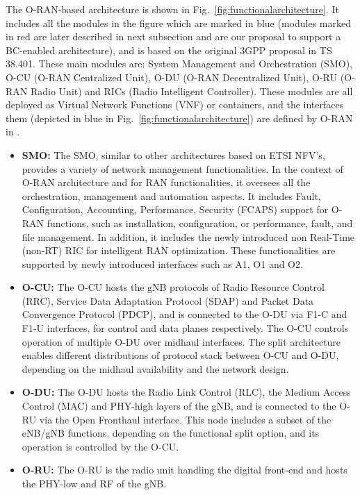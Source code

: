 \documentclass[journal]{IEEEtran}
\begin{document}
The O-RAN-based architecture is shown in Fig.~\ref{fig:functionalarchitecture}. It includes all the modules in the figure which are marked in blue (modules marked in red are later described in next subsection and are our proposal to support a BC-enabled architecture), and is based on the original 3GPP proposal in TS 38.401. These main modules are: System Management and Orchestration (SMO), O-CU (O-RAN Centralized Unit), O-DU (O-RAN Decentralized Unit), O-RU (O-RAN Radio Unit) and RICs (Radio Intelligent Controller). These modules are all deployed as Virtual Network Functions (VNF) or containers, and the interfaces them (depicted in blue in Fig.~\ref{fig:functionalarchitecture}) are defined by O-RAN in \cite{ORAN2}.  
\begin{itemize}
    \item \textbf{SMO:} The SMO, similar to other architectures based on ETSI NFV's, provides a variety of network management functionalities. In the context of O-RAN architecture and for RAN functionalities, it oversees all the orchestration, management and automation aspects. It includes Fault, Configuration, Accounting, Performance, Security (FCAPS) support for O-RAN functions, such as installation, configuration, or performance, fault, and file management. In addition, it includes the newly introduced non Real-Time (non-RT) RIC for intelligent RAN optimization. These functionalities are supported by newly introduced interfaces such as A1, O1 and O2.
    \item \textbf{O-CU:} The O-CU hosts the gNB protocols of Radio Resource Control (RRC), Service Data Adaptation Protocol (SDAP) and Packet Data Convergence Protocol (PDCP), and is connected to the O-DU via F1-C and F1-U interfaces, for control and data planes respectively. The O-CU controls operation of multiple O-DU over midhaul interfaces. The split architecture enables different distributions of protocol stack between O-CU and O-DU, depending on the midhaul availability and the network design. %
    \item \textbf{O-DU:} The O-DU hosts the Radio Link Control (RLC), the Medium Access Control (MAC) and PHY-high layers of the gNB, and is connected to the O-RU via the Open Fronthaul interface. This node includes a subset of the eNB/gNB functions, depending on the functional split option, and its operation is controlled by the O-CU.
    \item \textbf{O-RU:} The O-RU is the radio unit handling the digital front-end and hosts the PHY-low and RF of the gNB. 

\end{itemize}
\end{document}
